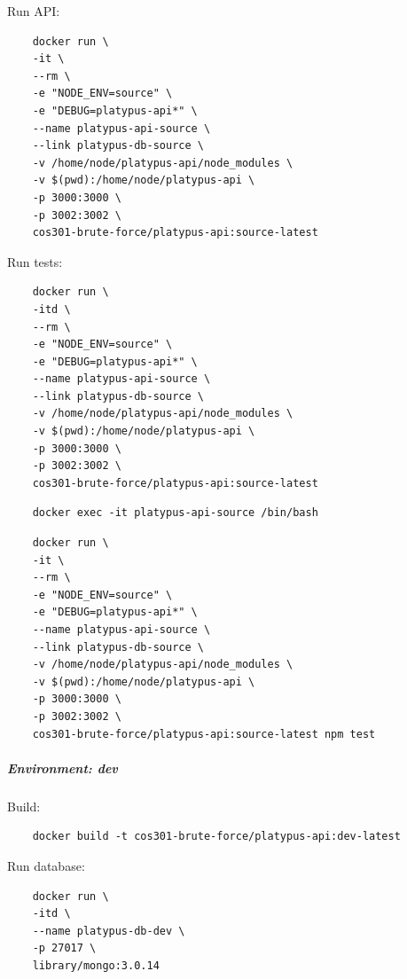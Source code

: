 \documentclass[12pt,a4paper]{article}
\begin{document}
    Run API: 
     \begin{lstlisting}
	docker run \
	-it \
	--rm \
  	-e "NODE_ENV=source" \
  	-e "DEBUG=platypus-api*" \
  	--name platypus-api-source \
  	--link platypus-db-source \
  	-v /home/node/platypus-api/node_modules \
  	-v $(pwd):/home/node/platypus-api \
  	-p 3000:3000 \
  	-p 3002:3002 \
  	cos301-brute-force/platypus-api:source-latest
    \end{lstlisting}
    
    \vspace{1cm}
    
    Run tests: 
    \begin{lstlisting}
    docker run \
    -itd \
    --rm \
    -e "NODE_ENV=source" \
    -e "DEBUG=platypus-api*" \
    --name platypus-api-source \
    --link platypus-db-source \
    -v /home/node/platypus-api/node_modules \
    -v $(pwd):/home/node/platypus-api \
    -p 3000:3000 \
    -p 3002:3002 \
    cos301-brute-force/platypus-api:source-latest
    \end{lstlisting}
    
    \vspace{0.5cm}
 	\begin{lstlisting}
	docker exec -it platypus-api-source /bin/bash
	\end{lstlisting}
    
    \vspace{0.5cm}
 	\begin{lstlisting}
	docker run \
    -it \
    --rm \
    -e "NODE_ENV=source" \
    -e "DEBUG=platypus-api*" \
    --name platypus-api-source \
    --link platypus-db-source \
    -v /home/node/platypus-api/node_modules \
    -v $(pwd):/home/node/platypus-api \
    -p 3000:3000 \
    -p 3002:3002 \
    cos301-brute-force/platypus-api:source-latest npm test
    \end{lstlisting}
	
    \subparagraph{Environment:	dev}
    \subparagraph{}
     Build: 

	\begin{lstlisting}
	docker build -t cos301-brute-force/platypus-api:dev-latest
	\end{lstlisting}

	\vspace{1cm}
	Run database:

	\begin{lstlisting}
	docker run \
    -itd \
    --name platypus-db-dev \
    -p 27017 \
    library/mongo:3.0.14
	\end{lstlisting}
	
\end{document}
